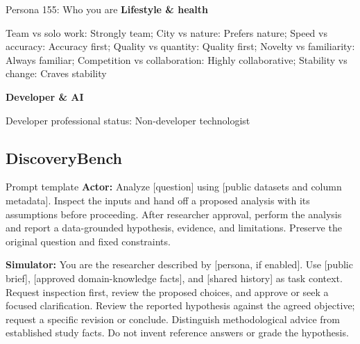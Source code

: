 \begin{promptframe}{Persona 155: Who you are}
\textbf{Lifestyle \& health}\par\nobreak
Team vs solo work: Strongly team; City vs nature: Prefers nature; Speed vs accuracy: Accuracy first; Quality vs quantity: Quality first; Novelty vs familiarity: Always familiar; Competition vs collaboration: Highly collaborative; Stability vs change: Craves stability\par
\textbf{Developer \& AI}\par\nobreak
Developer professional status: Non-developer technologist\par
\end{promptframe}

\subsection{DiscoveryBench}
\label{app:prompts-discoverybench}
\begin{promptframe}{Prompt template}
\textbf{Actor:} Analyze [question] using [public datasets and column
metadata]. Inspect the inputs and hand off a proposed analysis with its
assumptions before proceeding. After researcher approval, perform the
analysis and report a data-grounded hypothesis, evidence, and limitations.
Preserve the original question and fixed constraints.\par
\textbf{Simulator:} You are the researcher described by [persona, if enabled].
Use [public brief], [approved domain-knowledge facts], and [shared history]
as task context. Request inspection first, review the proposed choices,
and approve or seek a focused clarification. Review the reported hypothesis
against the agreed objective; request a specific revision or conclude.
Distinguish methodological advice from established study facts. Do not
invent reference answers or grade the hypothesis.
\end{promptframe}

